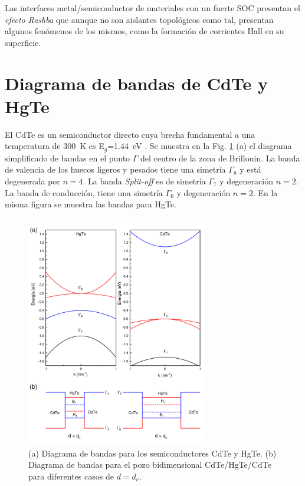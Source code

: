 Las interfaces metal/semiconductor de materiales con un fuerte SOC presentan el \textit{efecto Rashba} que aunque no son aislantes topológicos como tal, presentan algunos fenómenos de los mismos, como la formación de corrientes Hall en su superficie\cite{Lin2014, Bihlmayer2015}.

\section{Diagrama de bandas de CdTe y HgTe}
\label{ch1-band-diagram}
El CdTe es un semiconductor directo cuya brecha fundamental a una temperatura de \mbox{300 K} es \mbox{E$_{g}$=1.44 eV} \cite{Kittel2004-yd, Chadi1972}. Se muestra en la Fig. \ref{fig:band_diagram} (a) el diagrama simplificado de bandas en el punto $ \Gamma $ del centro de la zona de Brillouin\cite{Chadi1972}. La banda de valencia de los huecos ligeros y pesados tiene una simetría $ \Gamma_{8} $ y está degenerada por $n=4$. La banda \textit{Split-off} es de simetría $ \Gamma_{7} $ y degeneración $n=2$. La banda de conducción, tiene una simetría  $ \Gamma_{6} $ y degeneración $n=2$. En la misma figura se muestra las bandas para HgTe\cite{Chadi1972}.

\begin{figure}[H]
    \centering
    \includegraphics[width=0.7\textwidth]{figures/chap3/band_diagram.pdf}
        \caption{(a) Diagrama de bandas para los semiconductores CdTe y HgTe. (b) Diagrama de bandas para el pozo bidimensional CdTe/HgTe/CdTe para diferentes casos de $ d = d_{c} $\cite{Bernevig2006}.}
    \label{fig:band_diagram}
\end{figure}

